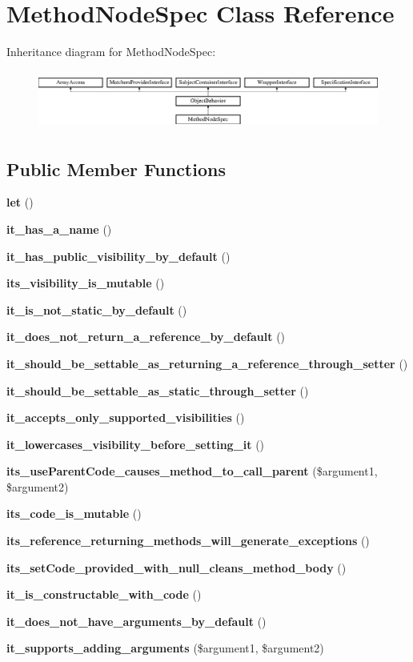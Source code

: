\section{Method\+Node\+Spec Class Reference}
\label{classspec_1_1_prophecy_1_1_doubler_1_1_generator_1_1_node_1_1_method_node_spec}
Inheritance diagram for Method\+Node\+Spec\+:\begin{figure}[H]
\begin{center}
\leavevmode
\includegraphics[height=1.953488cm]{classspec_1_1_prophecy_1_1_doubler_1_1_generator_1_1_node_1_1_method_node_spec}
\end{center}
\end{figure}
\subsection*{Public Member Functions}
\begin{DoxyCompactItemize}
\item 
{\bf let} ()
\item 
{\bf it\+\_\+has\+\_\+a\+\_\+name} ()
\item 
{\bf it\+\_\+has\+\_\+public\+\_\+visibility\+\_\+by\+\_\+default} ()
\item 
{\bf its\+\_\+visibility\+\_\+is\+\_\+mutable} ()
\item 
{\bf it\+\_\+is\+\_\+not\+\_\+static\+\_\+by\+\_\+default} ()
\item 
{\bf it\+\_\+does\+\_\+not\+\_\+return\+\_\+a\+\_\+reference\+\_\+by\+\_\+default} ()
\item 
{\bf it\+\_\+should\+\_\+be\+\_\+settable\+\_\+as\+\_\+returning\+\_\+a\+\_\+reference\+\_\+through\+\_\+setter} ()
\item 
{\bf it\+\_\+should\+\_\+be\+\_\+settable\+\_\+as\+\_\+static\+\_\+through\+\_\+setter} ()
\item 
{\bf it\+\_\+accepts\+\_\+only\+\_\+supported\+\_\+visibilities} ()
\item 
{\bf it\+\_\+lowercases\+\_\+visibility\+\_\+before\+\_\+setting\+\_\+it} ()
\item 
{\bf its\+\_\+use\+Parent\+Code\+\_\+causes\+\_\+method\+\_\+to\+\_\+call\+\_\+parent} (\$argument1, \$argument2)
\item 
{\bf its\+\_\+code\+\_\+is\+\_\+mutable} ()
\item 
{\bf its\+\_\+reference\+\_\+returning\+\_\+methods\+\_\+will\+\_\+generate\+\_\+exceptions} ()
\item 
{\bf its\+\_\+set\+Code\+\_\+provided\+\_\+with\+\_\+null\+\_\+cleans\+\_\+method\+\_\+body} ()
\item 
{\bf it\+\_\+is\+\_\+constructable\+\_\+with\+\_\+code} ()
\item 
{\bf it\+\_\+does\+\_\+not\+\_\+have\+\_\+arguments\+\_\+by\+\_\+default} ()
\item 
{\bf it\+\_\+supports\+\_\+adding\+\_\+arguments} (\$argument1, \$argument2)
\end{DoxyCompactItemize}
